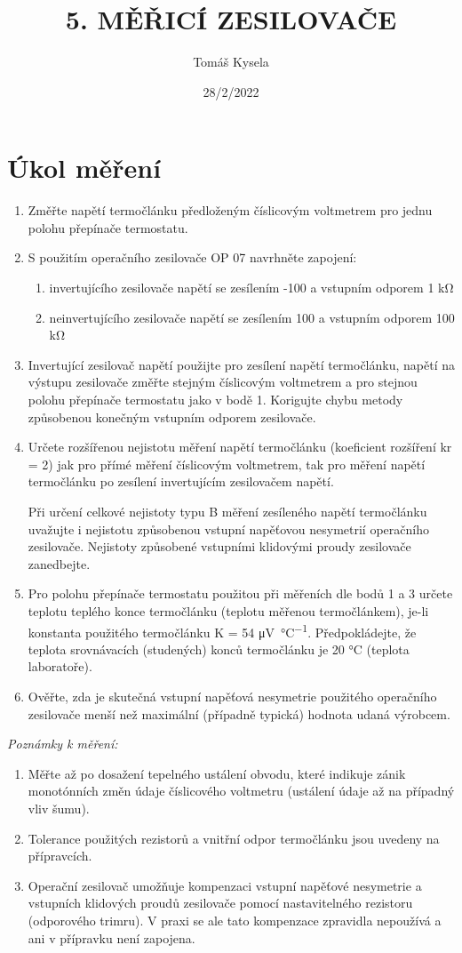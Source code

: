 \documentclass{article}
\title{\textbf{5. MĚŘICÍ ZESILOVAČE}}
\author{Tomáš Kysela}
\date{28/2/2022}
\begin{document}
\maketitle

\section{Úkol měření}
\begin{enumerate}
	\item Změřte napětí termočlánku předloženým číslicovým voltmetrem pro jednu polohu přepínače termostatu.
	\item S použitím operačního zesilovače OP 07 navrhněte zapojení:
	\begin{enumerate}
		\item invertujícího zesilovače napětí se zesílením -100 a vstupním odporem 1 \si{\kilo\ohm}
		\item neinvertujícího zesilovače napětí se zesílením 100 a vstupním odporem 100 \si{\kilo\ohm}	\end{enumerate}
	\item Invertující zesilovač napětí použijte pro zesílení napětí termočlánku, napětí na výstupu zesilovače změřte stejným číslicovým voltmetrem a pro stejnou  polohu  přepínače termostatu jako v bodě 1. Korigujte chybu metody způsobenou konečným vstupním odporem zesilovače.
	\item Určete rozšířenou nejistotu měření napětí termočlánku (koeficient rozšíření kr = 2) jak pro přímé měření číslicovým voltmetrem, tak pro měření napětí termočlánku  po	zesílení invertujícím zesilovačem napětí.
	
	Při určení celkové nejistoty typu  B  měření  zesíleného  napětí termočlánku uvažujte i nejistotu způsobenou vstupní napěťovou nesymetrií operačního zesilovače. Nejistoty způsobené vstupními klidovými proudy zesilovače zanedbejte.
	\item Pro polohu přepínače  termostatu použitou při měřeních dle bodů 1 a 3 určete teplotu teplého konce termočlánku (teplotu měřenou termočlánkem), je-li konstanta použitého termočlánku K = 54 \si{\micro\volt\per\degreeCelsius}. Předpokládejte, že teplota srovnávacích (studených) konců termočlánku je 20 °C (teplota laboratoře).
	\item Ověřte, zda je skutečná vstupní napěťová nesymetrie použitého operačního zesilovače menší než maximální (případně typická) hodnota udaná výrobcem.
\end{enumerate}
\textit{Poznámky k měření:}
\begin{enumerate}
	\item Měřte  až  po  dosažení  tepelného  ustálení  obvodu,  které  indikuje  zánik  monotónních  změn údaje číslicového voltmetru (ustálení údaje až na případný vliv šumu).
	\item Tolerance použitých rezistorů a vnitřní odpor termočlánku jsou uvedeny na přípravcích.
	\item Operační zesilovač umožňuje kompenzaci vstupní napěťové nesymetrie a vstupních klidových proudů zesilovače pomocí nastavitelného rezistoru (odporového trimru). V praxi se ale tato kompenzace zpravidla nepoužívá a ani v přípravku není zapojena.
\end{enumerate}
\end{document}
